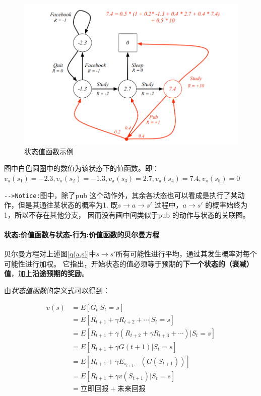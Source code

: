 \documentclass[UTF8,a4paper,12pt]{ctexbook}
\begin{document}
				\begin{figure}[H] 
					\centering
					\includegraphics[width=.8\linewidth]{MDP-example3}
					\caption{状态值函数示例}
				\end{figure}		
								
				图中白色圆圈中的数值为该状态下的值函数。即：$v_\pi(s_1) = -2.3, v_\pi(s_2) = -1.3, v_\pi(s_3) = 2.7, v_\pi(s_4) = 7.4, v_\pi(s_5) = 0$			
				
				\verb|-->Notice:|图中，除了pub 这个动作外，其余各状态也可以看成是执行了某动作，但是其通往某状态的概率为1. 既$s \to a \to s'$ 过程中，$a \to s'$ 的概率始终为1，所以不存在其他分支， 因而没有画中间类似于pub 的动作与状态的关联图。	
			
			\paragraph{状态:价值函数与状态-行为:价值函数的贝尔曼方程}
				
				贝尔曼方程对上述图\ref{q(a,s)}中$s \to s'$所有可能性进行平均，通过其发生概率对每个可能性进行加权。 它指出，开始状态的值必须等于预期的\textbf{下一个状态的（衰减）值}，加上\textbf{沿途预期的奖励}。
			
				由\textit{状态值函数}的定义式可以得到：
				
				\begin{equation}
					\begin{aligned}
						v(s) &= E[G_t|S_t = s]	\\
							&= E[R_{t+1} + \gamma R_{t+2} + \cdots | S_t = s] \\
							&= E[R_{t+1} + \gamma (R_{t+2} + \gamma R_{t+3} + \cdots)|S_t = s]\\
							&= E[R_{t+1} + \gamma G(t+1)|S_t = s]	\\
							&= E[R_{t+1} + \gamma E_{s_{t+1},\cdots}(G(S_{t+1}))]	\\
							&= E[R_{t+1} + \gamma v(S_{t+1})|S_t = s]	\\
							&= \textit{立即回报} + \textit{未来回报}
					\end{aligned}
				\end{equation}
				
\end{document}
